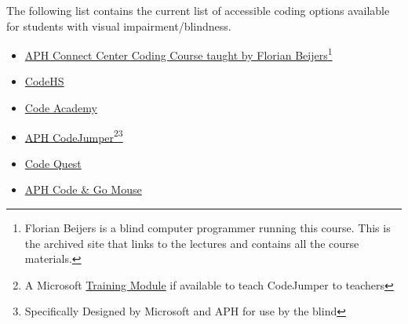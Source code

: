 \pagebreak The following list contains the current list of accessible coding options available for students with visual impairment/blindness. 
\begin{itemize}[leftmargin=*]
 \item \href{https://zersiax.github.io/}{APH Connect Center Coding Course taught by Florian Beijers}\footnote{\raggedright Florian Beijers is a blind computer programmer running this course. This is the archived site that links to the lectures and contains all the course materials.}
 \item \href{https://codehs.com/}{CodeHS}
 \item \href{https://www.codecademy.com/}{Code Academy}
 \item \href{https://codejumper.com/}{APH CodeJumper}\footnote{\raggedright A Microsoft \href{https://docs.microsoft.com/en-us/learn/modules/code-jumper-inclusive-physical-coding-language/}{Training Module} if available to teach CodeJumper to teachers}\fnsep\footnote{\raggedright Specifically Designed by Microsoft and APH for use by the blind}
 \item \href{https://www.aph.org/product/code-quest-for-ipad-iphone/}{Code Quest}\footnotemark[\value{footnote}]
 \item \href{https://www.aph.org/product/accessible-code-and-go-mouse/}{APH Code \& Go Mouse}\footnotemark[\value{footnote}]
\end{itemize}